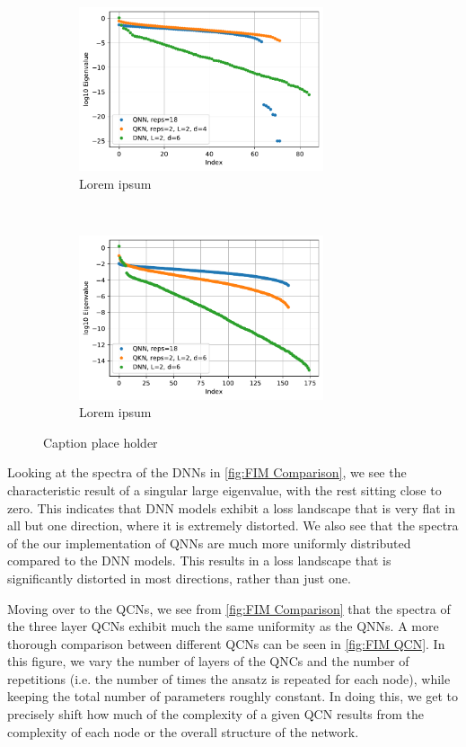 \begin{figure}[H]
    \centering
    \begin{subfigure}[t]{0.5\textwidth}
        \centering
        \includegraphics[height=1.9in]{latex/figures/FIM_qubits_4.pdf}
        \caption{Lorem ipsum}
        
    \end{subfigure}%
    ~ 
    \begin{subfigure}[t]{0.5\textwidth}
        \centering
        \includegraphics[height=1.9in]{latex/figures/FIM_qubits_6.pdf}
        \caption{Lorem ipsum}
    \end{subfigure}
    \caption{Caption place holder}
    \label{fig:FIM Comparison}
\end{figure}

Looking at the spectra of the DNNs in \autoref{fig:FIM Comparison}, we see the characteristic result of a singular large eigenvalue, with the rest sitting close to zero. This indicates that DNN models exhibit a loss landscape that is very flat in all but one direction, where it is extremely distorted. We also see that the spectra of the our implementation of QNNs are much more uniformly distributed compared to the DNN models. This results in a loss landscape that is significantly distorted in most directions, rather than just one. 

Moving over to the QCNs, we see from \autoref{fig:FIM Comparison} that the spectra of the three layer QCNs exhibit much the same uniformity as the QNNs. A more thorough comparison between different QCNs can be seen in \autoref{fig:FIM QCN}. In this figure, we vary the number of layers of the QNCs and the number of repetitions (i.e. the number of times the ansatz is repeated for each node), while keeping the total number of parameters roughly constant. In doing this, we get to precisely shift how much of the complexity of a given QCN results from the complexity of each node or the overall structure of the network.

